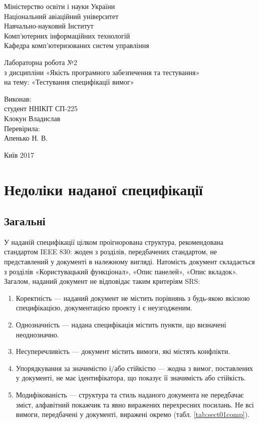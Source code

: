 \documentclass[a4paper,oneside,12pt,DIV=12,titlepage,toc]{scrartcl}
\begin{document}
	\begin{titlepage}
		\begin{center}
			Міністерство освіти і науки України\\
			Національний авіаційний університет\\
			Навчально-науковий Інститут\\
			Комп'ютерних інформаційних технологій\\
			Кафедра комп'ютеризованих систем управління
			
			\vspace{\fill}
				Лабораторна робота №2\\
				з дисципліни «Якість програмного забезпечення та тестування»\\
				на тему: «Тестування специфікації вимог»\\
				
			\vspace{\fill}
			
			\begin{flushright}
				Виконав:\\
				студент ННІКІТ СП-225\\
				Клокун Владислав\\
				Перевірила:\\
				Апенько Н. В.
			\end{flushright}
			Київ 2017
		\end{center}
	\end{titlepage}
	
	\section{Недоліки наданої специфікації}
		\subsection{Загальні}
			У наданій специфікації цілком проігнорована структура, рекомендована стандартом IEEE 830: жоден з розділів, передбачених стандартом, не представлений у документі в належному вигляді.
			Натомість документ складається з розділів «Користувацький функціонал», «Опис панелей», «Опис вкладок».
			Загалом, наданий документ не відповідає таким критеріям SRS:
			\begin{enumerate}
				\item Коректність --- наданий документ не містить порівнянь з будь-якою якісною специфікацією, документацією проекту і є неузгодженим.
				\item Однозначність --- надана специфікація містить пункти, що визначені неоднозначно. 
				\item Несуперечливість --- документ містить вимоги, які містять конфлікти.
				\item Упорядкування за значимістю і/або стійкістю --- жодна з вимог, поставлених у документі, не має ідентифікатора, що показує її значимість або стійкість.
				\item Модифікованість --- структура та стиль наданого документа не передбачає зміст, алфавітний покажчик та явно виражених перехресних посилань. Не всі вимоги, передбачені у документі, виражені окремо (табл. \ref{tab:sect01comp}). 
			\end{enumerate}
\end{document}
